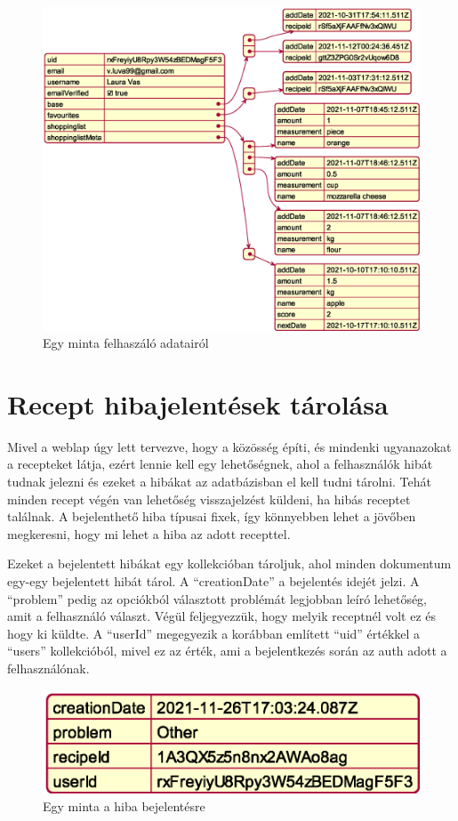 \documentclass[12pt]{report}
\theoremstyle{definition}
\begin{document}
\noindent
\begin{figure}[H]
	\centering
	\includegraphics[width=\textwidth]{out/diagrams/jsonUsers/jsonUsers.eps}
	\caption{Egy minta felhaszáló adatairól}
    \label{fig:jsonUsers}
\end{figure}

\section{Recept hibajelentések tárolása} 
Mivel a weblap úgy lett tervezve, hogy a közösség építi, és mindenki ugyanazokat a recepteket látja, ezért lennie kell egy lehetőségnek, ahol a felhasználók hibát tudnak jelezni és ezeket a hibákat az adatbázisban el kell tudni tárolni. Tehát minden recept végén van lehetőség visszajelzést  küldeni, ha hibás receptet találnak. A bejelenthető hiba típusai fixek, így könnyebben lehet a jövőben megkeresni, hogy mi lehet a hiba az adott recepttel. 

Ezeket a bejelentett hibákat egy kollekcióban tároljuk, ahol minden dokumentum egy-egy bejelentett hibát tárol. A “creationDate” a bejelentés idejét jelzi. A “problem” pedig az opciókból választott problémát legjobban leíró lehetőség, amit a felhasználó választ. Végül feljegyezzük, hogy melyik receptnél volt ez és hogy ki küldte. A “userId” megegyezik a korábban említett “uid” értékkel a “users” kollekcióból, mivel ez az érték, ami a bejelentkezés során az auth adott a felhasználónak.

\noindent
\begin{figure}[H]
	\centering
	\includegraphics[scale=0.6]{out/diagrams/jsonReports/jsonReports.eps}
	\caption{Egy minta a hiba bejelentésre}
    \label{fig:jsonReports}
\end{figure}
\end{document}
